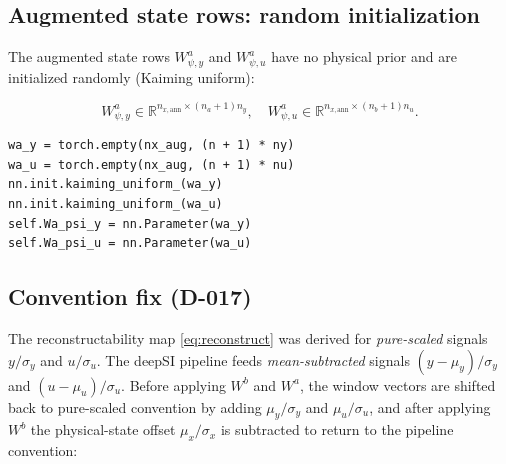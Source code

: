 \documentclass[11pt,a4paper]{article}
\newcommand{\codetitle}[2]{\small\texttt{#1}\quad lines #2}
\begin{document}
\subsection{Augmented state rows: random initialization}

The augmented state rows $W_{\psi,y}^a$ and $W_{\psi,u}^a$ have no
physical prior and are initialized randomly (Kaiming uniform):

\begin{equation}
  W_{\psi,y}^a \in \mathbb{R}^{n_{x,\mathrm{ann}} \times (n_a+1)n_y}, \quad
  W_{\psi,u}^a \in \mathbb{R}^{n_{x,\mathrm{ann}} \times (n_b+1)n_u}.
  \label{eq:Wa}
\end{equation}

\begin{lstlisting}[style=py,
  title={\codetitle{model\_augmentation/fit\_systems/pre\_encoder.py}{400--405}},
  firstnumber=400]
wa_y = torch.empty(nx_aug, (n + 1) * ny)
wa_u = torch.empty(nx_aug, (n + 1) * nu)
nn.init.kaiming_uniform_(wa_y)
nn.init.kaiming_uniform_(wa_u)
self.Wa_psi_y = nn.Parameter(wa_y)
self.Wa_psi_u = nn.Parameter(wa_u)
\end{lstlisting}

\subsection{Convention fix (D-017)}

The reconstructability map \eqref{eq:reconstruct} was derived for
\emph{pure-scaled} signals $y / \sigma_y$ and $u / \sigma_u$.
The deepSI pipeline feeds \emph{mean-subtracted} signals
$(y - \mu_y)/\sigma_y$ and $(u - \mu_u)/\sigma_u$.
Before applying $W^b$ and $W^a$, the window vectors are shifted back
to pure-scaled convention by adding $\mu_y/\sigma_y$ and $\mu_u/\sigma_u$,
and after applying $W^b$ the physical-state offset $\mu_x/\sigma_x$ is
subtracted to return to the pipeline convention:
\end{document}
